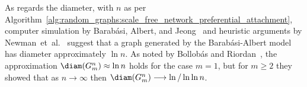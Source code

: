 As regards the diameter, with $n$ as per
Algorithm~\ref{alg:random_graphs:scale_free_network_preferential_attachment},
computer simulation by Barab\'asi, Albert, and
Jeong~\cite{AlbertEtAl1999,BarabasiEtAl2000} and heuristic arguments
by Newman~et~al.~\cite{NewmanEtAl2001} suggest that a graph generated
by the Barab\'asi-Albert model has diameter approximately
$\ln n$. As noted by Bollob\'as and Riordan~\cite{BollobasRiordan2004},
the approximation $\diam(G_m^n) \approx \ln n$ holds for the case
$m = 1$, but for $m \geq 2$ they showed that as $n \to \infty$ then
$\diam(G_m^n) \to \ln / \ln \ln n$.












